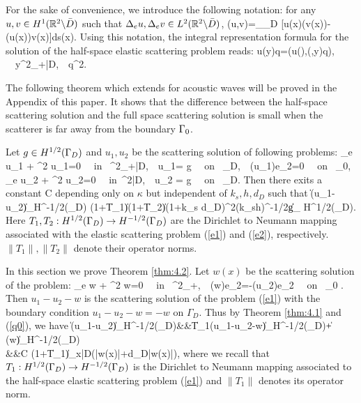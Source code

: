 For the sake of convenience, we introduce the following notation: for any $u,v\in H^1(\mathbb{R}^2\backslash\bar D)$ such that $\Delta_e u, \Delta_e v\in L^2(\mathbb{R}^2\backslash\bar D)$,
\be\label{g1}
\GG(u,v)=\int_{\Ga_D} [u(x)\cdot \sigma(v(x))\nu- \sigma(u(x))\nu\cdot v(x)]ds(x).
\ee
Using this notation, the integral representation formula for the solution of the half-space elastic scattering problem reads: 
\be\label{g2}
u(y)\cdot q=\GG(u(\cdot),\N(\cdot,y)q), \ \ \forall y\in\R^2_+\bks\bar D,\ \ \forall q\in\R^2.
\ee





The following theorem which extends \cite[Theorem 4.1]{RTMhalf_aco} for acoustic waves will be proved in the Appendix of this paper. It shows that the difference between the half-space scattering solution and the full space scattering solution is small when the scatterer is far away from the boundary $\Gamma_0$.

\begin{thm}\label{thm:4.2}
	Let $g\in H^{1/2}(\Gamma_D)$ and $u_1,u_2$ be the scattering solution of following problems:
	\be\label{e1}
	\Delta_e u_1 + \omega^2 u_1=0 \ \ \mbox{\rm in } \R^2_+\bks \bar{D},\ \  u_1= g \ \ \mbox{\rm on } \Ga_D,\ \ \sigma(u_1)e_2=0 \ \ \mbox{\rm on } \Ga_0,\\
	\label{e2}
	\Delta_e u_2 + \omega^2 u_2=0 \ \ \mbox{\rm in }\R^2\bks \bar{D},\ \ u_2 = g \ \ \mbox{\rm on } \Ga_D.
	\ee
	Then there exits a constant C depending only on $\kappa$ but independent of $k_s, h,d_D$ such that
	\ben\hskip-2cm
	\|\sigma(u_1-u_2)\nu\|_{H^{-1/2}(\Gamma_D)}
	\le{}(1+\|T_1\|)(1+\|T_2\|)(1+k_s d_D)^2(k_sh)^{-1/2}\|g\|_{ H^{1/2}(\Ga_D)}.
	\een
	Here $T_1, T_2:H^{1/2}(\Gamma_D)\to H^{-1/2}(\Gamma_D)$ are the Dirichlet to Neumann mapping associated with the elastic scattering problem (\ref{e1}) and (\ref{e2}), respectively. $\|T_1\|, \|T_2\|$ denote their operator norms.
\end{thm}

In this section we prove Theorem \ref{thm:4.2}.
Let $w(x)$ be the scattering solution of the problem:
\be\label{f2}
\Delta_e w + \omega^2 w=0 \ \ \mbox{\rm in } \R^2_+,\ \ 
\sigma(w)e_2=-\sigma(u_2)e_2 \ \ \mbox{\rm on } \Ga_0 .
\ee
Then $u_1-u_2-w$ is the scattering solution of the problem (\ref{e1}) with the boundary condition $u_1-u_2-w=-w$ on $\Gamma_D$. Thus by Theorem \ref{thm:4.1} and (\ref{q0}), we have
\be
\hskip-1cm\|\sigma(u_1-u_2)\nu\|_{H^{-1/2}(\Gamma_D)}&\leq&\|T_1(u_1-u_2-w)\|_{H^{-1/2}(\Gamma_D)}+\|\sigma(w)\nu\|_{H^{-1/2}(\Gamma_D)}\nn\\
&\leq&C (1+\|T_1\|)\max_{x\in \bar D}(|w(x)|+d_D|\nabla w(x)|),\label{f5}
\ee
where we recall that $T_1:H^{1/2}(\Gamma_D)\to H^{-1/2}(\Gamma_D)$ is the Dirichlet to Neumann mapping associated to the half-space elastic scattering problem (\ref{e1}) and $\|T_1\|$ denotes its operator norm.

